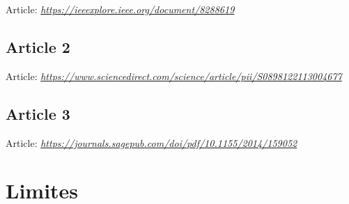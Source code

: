 \documentclass[12pt]{article}
\begin{document}
Article: \textit{\url{https://ieeexplore.ieee.org/document/8288619}}

\subsection{Article 2}

Article: \textit{\url{https://www.sciencedirect.com/science/article/pii/S0898122113004677}}

\subsection{Article 3}

Article: \textit{\url{https://journals.sagepub.com/doi/pdf/10.1155/2014/159052}}

\section{Limites}
\end{document}
